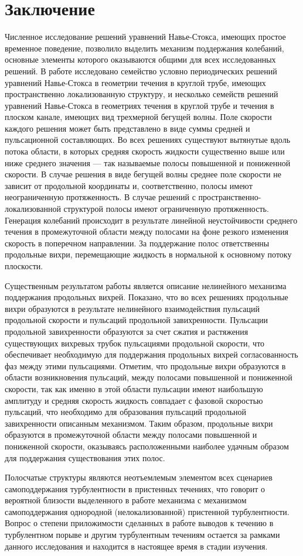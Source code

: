 \chapter*{Заключение} 


Численное исследование решений уравнений Навье-Стокса, имеющих простое временное поведение, позволило выделить механизм поддержания колебаний, основные элементы которого оказываются общими для всех исследованных решений. В работе исследовано семейство условно периодических решений уравнений Навье-Стокса в геометрии течения в круглой трубе, имеющих пространственно локализованную структуру, и несколько семейств решений уравнений Навье-Стокса в геометриях течения в круглой трубе и течения в плоском канале, имеющих вид трехмерной бегущей волны. Поле скорости каждого решения может быть представлено в виде суммы средней и пульсационной составляющих. Во всех решениях существуют вытянутые вдоль потока области, в которых средняя скорость жидкости существенно выше или ниже среднего значения --- так называемые полосы повышенной и пониженной скорости. В случае решения в виде бегущей волны среднее поле скорости не зависит от продольной координаты и, соответственно, полосы имеют неограниченную протяженность. В случае решений с пространственно-локализованной структурой полосы имеют ограниченную протяженность. Генерация колебаний происходит в результате линейной неустойчивости среднего течения в промежуточной области между полосами на фоне резкого изменения скорость в поперечном направлении. За поддержание полос ответственны продольные вихри, перемещающие жидкость в нормальной к основному потоку плоскости. 

Существенным результатом работы является описание нелинейного механизма поддержания продольных вихрей. Показано, что во всех решениях продольные вихри образуются в результате нелинейного взаимодействия пульсаций продольной скорости и пульсаций продольной завихренности. Пульсации продольной завихренности образуются за счет сжатия и растяжения существующих вихревых трубок пульсациями продольной скорости, что обеспечивает необходимую для поддержания продольных вихрей согласованность фаз между этими пульсациями. Отметим, что продольные вихри образуются в области возникновения пульсаций, между полосами повышенной и пониженной скорости, так как именно в этой области пульсации имеют наибольшую амплитуду и средняя скорость жидкость совпадает с фазовой скоростью пульсаций, что необходимо для образования пульсаций продольной завихренности описанным механизмом. Таким образом, продольные вихри образуются в промежуточной области между полосами повышенной и пониженной скорости, оказываясь расположенными наиболее удачным образом для поддержания существования этих полос. 

Полосчатые структуры являются неотъемлемым элементом всех сценариев самоподдержания турбулентности в пристенных течениях, что говорит о вероятной близости выделенного в работе механизма с механизмом самоподдержания однородной (нелокализованной) пристенной турбулентности. Вопрос о степени приложимости сделанных в работе выводов к течению в турбулентном порыве и другим турбулентным течениям остается за рамками данного исследования и находится в настоящее время в стадии изучения.
